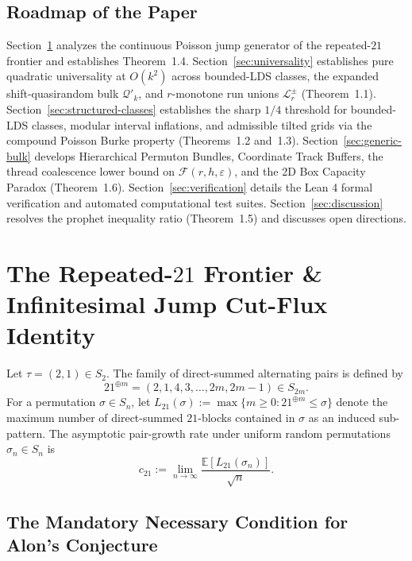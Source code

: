 \documentclass[
  11pt,
]{article}
\begin{document}
\subsection{Roadmap of the Paper}\label{outline-of-the-paper}

Section~\ref{sec:c21} analyzes the continuous Poisson jump generator of the repeated-$21$ frontier and establishes Theorem~1.4. Section~\ref{sec:universality} establishes pure quadratic universality at $O(k^2)$ across bounded-LDS classes, the expanded shift-quasirandom bulk $\mathcal{Q}'_k$, and $r$-monotone run unions $\mathcal{L}^\pm_r$ (Theorem~1.1). Section~\ref{sec:structured-classes} establishes the sharp $1/4$ threshold for bounded-LDS classes, modular interval inflations, and admissible tilted grids via the compound Poisson Burke property (Theorems~1.2 and~1.3). Section~\ref{sec:generic-bulk} develops Hierarchical Permuton Bundles, Coordinate Track Buffers, the thread coalescence lower bound on $\mathcal{F}(r, h, \varepsilon)$, and the 2D Box Capacity Paradox (Theorem~1.6). Section~\ref{sec:verification} details the Lean 4 formal verification and automated computational test suites. Section~\ref{sec:discussion} resolves the prophet inequality ratio (Theorem~1.5) and discusses open directions.

\section{The Repeated-\(21\) Frontier \& Infinitesimal Jump Cut-Flux Identity}\label{sec:c21}

Let \(\tau = (2, 1) \in S_2\). The family of direct-summed alternating
pairs is defined by \[
21^{\oplus m} = (2, 1, 4, 3, \dots, 2m, 2m-1) \in S_{2m}.
\] For a permutation \(\sigma \in S_n\), let
\(L_{21}(\sigma) := \max\{m \ge 0 : 21^{\oplus m} \le \sigma\}\) denote
the maximum number of direct-summed \(21\)-blocks contained in
\(\sigma\) as an induced sub-pattern. The asymptotic pair-growth rate
under uniform random permutations \(\sigma_n \in S_n\) is \[
c_{21} := \lim_{n \to \infty} \frac{\mathbb{E}[L_{21}(\sigma_n)]}{\sqrt{n}}.
\]

\subsection{The Mandatory Necessary Condition for Alon's
Conjecture}\label{the-mandatory-necessary-condition-for-alons-conjecture}
\end{document}
